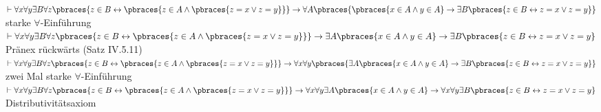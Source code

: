\begin{solution}
\begin{algorithmic}[1]
	\State $\vdash \forall x \forall y \exists B \forall z \pbraces{z \in B \leftrightarrow \pbraces{ z \in A \land \pbraces{z = x \lor z = y}}} \rightarrow \forall A\pbraces{\pbraces{x \in A \land y \in A} \rightarrow \exists B \pbraces{z \in B \leftrightarrow z = x \lor z=y}}$ \Comment starke $\forall$-Einführung
	\State $\vdash \forall x \forall y \exists B \forall z \pbraces{z \in B \leftrightarrow \pbraces{ z \in A \land \pbraces{z = x \lor z = y}}} \rightarrow \exists A \pbraces{x \in A \land y \in A} \rightarrow \exists B \pbraces{z \in B \leftrightarrow z = x \lor z=y}$ \Comment Pränex rückwärts (Satz IV.5.11)
	\State $\vdash \forall x \forall y \exists B \forall z \pbraces{z \in B \leftrightarrow \pbraces{ z \in A \land \pbraces{z = x \lor z = y}}} \rightarrow \forall x \forall y\pbraces{\exists A \pbraces{x \in A \land y \in A} \rightarrow \exists B \pbraces{z \in B \leftrightarrow z = x \lor z=y}}$ \Comment zwei Mal starke $\forall$-Einführung
	\State $\vdash \forall x \forall y \exists B \forall z \pbraces{z \in B \leftrightarrow \pbraces{ z \in A \land \pbraces{z = x \lor z = y}}} \rightarrow \forall x \forall y \exists A \pbraces{x \in A \land y \in A} \rightarrow \forall x \forall y \exists B \pbraces{z \in B \leftrightarrow z = x \lor z=y}$ \Comment Distributivitätsaxiom
\end{algorithmic}

\end{solution}
